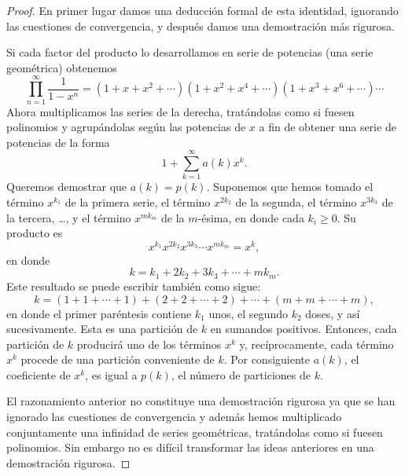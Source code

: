     \begin{proof}
        En primer lugar damos una deducción formal de esta identidad, ignorando las cuestiones
        de convergencia, y después damos una demostración más rigurosa.

        Si cada factor del producto lo desarrollamos en serie de potencias (una serie
        geométrica) obtenemos
        \begin{equation*}
            \prod_{n=1}^{\infty}\frac{1}{1-x^n}=(1+x+x^2+\cdots)(1+x^2+x^4+\cdots)(1+x^3+x^6+\cdots)\cdots
        \end{equation*}
        Ahora multiplicamos las series de la derecha, tratándolas como si fuesen polinomios y
        agrupándolas según las potencias de $x$ a fin de obtener una serie de potencias de la
        forma
        \begin{equation*}
            1+\sum_{k=1}^{\infty}a(k)x^k.
        \end{equation*}
        Queremos demostrar que $a(k)=p(k)$. Suponemos que hemos tomado el término $x^{k_1}$ de
        la primera serie, el término $x^{2k_2}$ de la segunda, el término $x^{3k_3}$ de la
        tercera, \dots, y el término $x^{mk_m}$ de la $m$-ésima, en donde cada $k_i\geq0$. Su
        producto es
        \begin{equation*}
            x^{k_1}x^{2k_2}x^{3k_3}\cdots x^{mk_m}=x^k,
        \end{equation*}
        en donde
        \begin{equation*}
            k=k_1+2k_2+3k_3+\cdots+mk_m.
        \end{equation*}
        Este resultado se puede escribir también como sigue:
        \begin{equation*}
            k=(1+1+\cdots+1)+(2+2+\cdots+2)+\cdots+(m+m+\cdots+m),
        \end{equation*}
        en donde el primer paréntesis contiene $k_1$ unos, el segundo $k_2$ doses, y así
        sucesivamente. Esta es una partición de $k$ en sumandos positivos. Entonces, cada
        partición de $k$ producirá uno de los términos $x^k$ y, recíprocamente, cada término
        $x^k$ procede de una partición conveniente de $k$. Por consiguiente $a(k)$, el
        coeficiente de $x^k$, es igual a $p(k)$, el número de particiones de $k$.

        El razonamiento anterior no constituye una demostración rigurosa ya que se han ignorado
        las cuestiones de convergencia y además hemos multiplicado conjuntamente una infinidad
        de series geométricas, tratándolas como si fuesen polinomios. Sin embargo no es difícil
        transformar las ideas anteriores en una demostración rigurosa.


\end{proof}
